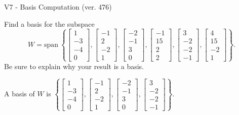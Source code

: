 \begin{exercise}
  \begin{exerciseTitle}V7 - Basis Computation (ver. 476)\end{exerciseTitle}
  \begin{exerciseStatement}
    Find a basis for the subspace 
\[W=\mathrm{span}\ \left\{\left[\begin{array}{r}
1 \\
-3 \\
-4 \\
0
\end{array}\right] , \left[\begin{array}{r}
-1 \\
2 \\
-2 \\
1
\end{array}\right] , \left[\begin{array}{r}
-2 \\
-1 \\
3 \\
0
\end{array}\right] , \left[\begin{array}{r}
-1 \\
15 \\
2 \\
2
\end{array}\right] , \left[\begin{array}{r}
3 \\
-2 \\
-2 \\
-1
\end{array}\right] , \left[\begin{array}{r}
4 \\
15 \\
-2 \\
1
\end{array}\right]\right\}.\]
 Be sure to explain why your result is a basis.


  \end{exerciseStatement}
  \begin{exerciseAnswer}
   A basis of \(W\) is  \(\left\{\left[\begin{array}{r}
1 \\
-3 \\
-4 \\
0
\end{array}\right] , \left[\begin{array}{r}
-1 \\
2 \\
-2 \\
1
\end{array}\right] , \left[\begin{array}{r}
-2 \\
-1 \\
3 \\
0
\end{array}\right] , \left[\begin{array}{r}
3 \\
-2 \\
-2 \\
-1
\end{array}\right]\right\}\).
  


  \end{exerciseAnswer}
\end{exercise}